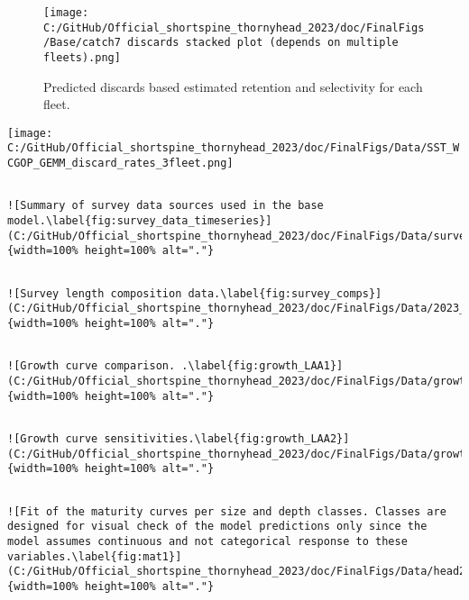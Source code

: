 \documentclass[11pt,
  english,
  letterpaper,
]{article}
\begin{document}
\begin{figure}
\centering
\texttt{[image: C:/GitHub/Official\_shortspine\_thornyhead\_2023/doc/FinalFigs/Base/catch7 discards stacked plot (depends on multiple fleets).png]}
\caption{Predicted discards based estimated retention and selectivity for each fleet.\label{fig:disc_hist}}
\end{figure}

\texttt{[image: C:/GitHub/Official\_shortspine\_thornyhead\_2023/doc/FinalFigs/Data/SST\_WCGOP\_GEMM\_discard\_rates\_3fleet.png]} \newpage

\begin{verbatim}

![Summary of survey data sources used in the base model.\label{fig:survey_data_timeseries}](C:/GitHub/Official_shortspine_thornyhead_2023/doc/FinalFigs/Data/survey_data_timeseries.png){width=100% height=100% alt="."}
\end{verbatim}

\begin{verbatim}

![Survey length composition data.\label{fig:survey_comps}](C:/GitHub/Official_shortspine_thornyhead_2023/doc/FinalFigs/Data/2023_length_compositions.png){width=100% height=100% alt="."}
\end{verbatim}

\begin{verbatim}

![Growth curve comparison. .\label{fig:growth_LAA1}](C:/GitHub/Official_shortspine_thornyhead_2023/doc/FinalFigs/Data/growth_curve_comparison_LAA1.png){width=100% height=100% alt="."}
\end{verbatim}

\begin{verbatim}

![Growth curve sensitivities.\label{fig:growth_LAA2}](C:/GitHub/Official_shortspine_thornyhead_2023/doc/FinalFigs/Data/growth_curve_sensitivities_LAA2.png){width=100% height=100% alt="."}
\end{verbatim}

\begin{verbatim}

![Fit of the maturity curves per size and depth classes. Classes are designed for visual check of the model predictions only since the model assumes continuous and not categorical response to these variables.\label{fig:mat1}](C:/GitHub/Official_shortspine_thornyhead_2023/doc/FinalFigs/Data/head2023_maturity_latdepth_glm_fit.png){width=100% height=100% alt="."}
\end{verbatim}
\end{document}

